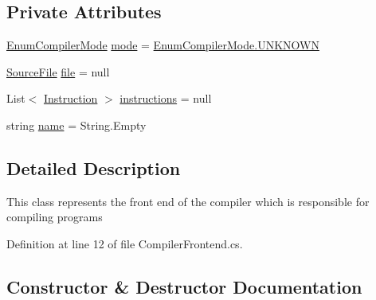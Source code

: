 \subsection*{Private Attributes}
\begin{DoxyCompactItemize}
\item 
\hyperlink{namespace_c_p_u___o_s___simulator_1_1_compiler_ada8d93b571fa15a0f2eac8c9647a89fe}{Enum\+Compiler\+Mode} \hyperlink{class_c_p_u___o_s___simulator_1_1_compiler_1_1_compiler_frontend_aa02bf709b3e3b19e45f89c8c2864afb4}{mode} = \hyperlink{namespace_c_p_u___o_s___simulator_1_1_compiler_ada8d93b571fa15a0f2eac8c9647a89fea696b031073e74bf2cb98e5ef201d4aa3}{Enum\+Compiler\+Mode.\+U\+N\+K\+N\+O\+W\+N}
\item 
\hyperlink{class_c_p_u___o_s___simulator_1_1_compiler_1_1_source_file}{Source\+File} \hyperlink{class_c_p_u___o_s___simulator_1_1_compiler_1_1_compiler_frontend_a57d54910e0df9189cf333b95d9123641}{file} = null
\item 
List$<$ \hyperlink{class_c_p_u___o_s___simulator_1_1_c_p_u_1_1_instruction}{Instruction} $>$ \hyperlink{class_c_p_u___o_s___simulator_1_1_compiler_1_1_compiler_frontend_aec71846f593e4bdcbd7d63a49b3b25bd}{instructions} = null
\item 
string \hyperlink{class_c_p_u___o_s___simulator_1_1_compiler_1_1_compiler_frontend_a2b4facf897341f61d4db60dc7fdc67c4}{name} = String.\+Empty
\end{DoxyCompactItemize}


\subsection{Detailed Description}
This class represents the front end of the compiler which is responsible for compiling programs 



Definition at line 12 of file Compiler\+Frontend.\+cs.



\subsection{Constructor \& Destructor Documentation}
\hypertarget{class_c_p_u___o_s___simulator_1_1_compiler_1_1_compiler_frontend_ac3122a57986de8d3bfb16a78af8e49a1}{}
